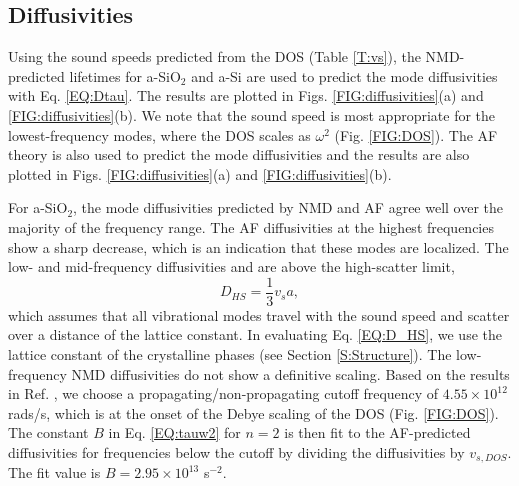 \subsection{\label{S:Diffusivities}Diffusivities}

Using the sound speeds predicted 
from the DOS (Table \ref{T:vs}), the NMD-predicted lifetimes 
for a-SiO$_2$ and a-Si are used to predict the mode diffusivities with 
Eq. \eqref{EQ:Dtau}. The results are plotted in 
Figs. \ref{FIG:diffusivities}(a) and \ref{FIG:diffusivities}(b).  
We note that the sound speed is most appropriate  
for the lowest-frequency modes, where the DOS scales as $\omega^2$ 
(Fig. \ref{FIG:DOS}). The AF theory is also used to predict the mode 
diffusivities and the results are also plotted in 
Figs. \ref{FIG:diffusivities}(a) and \ref{FIG:diffusivities}(b). 

For a-SiO$_2$, the mode diffusivities predicted by NMD and AF agree 
well over the majority of the frequency range. The AF diffusivities at 
the highest frequencies 
show a sharp decrease, which is an indication 
that these modes are localized.\cite{feldman_thermal_1993} 
The low- and mid-frequency diffusivities and are above the 
high-scatter limit, 
\begin{equation}\label{EQ:D_HS}
D_{HS} = \frac{1}{3} v_s a,
\end{equation}
which assumes that all vibrational modes travel with the sound speed  
and scatter over a distance of the lattice constant.
\cite{cahill_lattice_1988} In evaluating Eq. \eqref{EQ:D_HS}, 
we use the lattice constant of the 
crystalline phases (see Section \ref{S:Structure}). The low-frequency 
NMD diffusivities do not show a 
definitive scaling. Based on the results in 
Ref. , we choose a 
propagating/non-propagating cutoff frequency of 
$4.55\times10^{12}$ rads/s, which is at the onset 
of the Debye scaling of the DOS (Fig. \ref{FIG:DOS}). 
The constant $B$ in Eq. \eqref{EQ:tauw2} for $n=2$ 
is then fit to the AF-predicted diffusivities for 
frequencies below the cutoff by dividing the diffusivities 
by $v_{s,DOS}$. The fit value is $B=2.95\times10^{13}$ s$^{-2}$.

